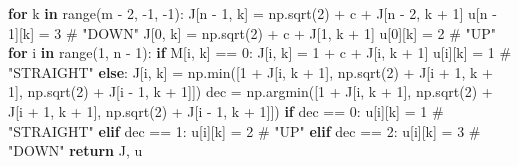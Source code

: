\documentclass[
]{article}
\newenvironment{Shaded}{\begin{snugshade}}{\end{snugshade}}
\newcommand{\BuiltInTok}[1]{\textcolor[rgb]{0.00,0.23,0.31}{#1}}
\newcommand{\CommentTok}[1]{\textcolor[rgb]{0.37,0.37,0.37}{#1}}
\newcommand{\ControlFlowTok}[1]{\textcolor[rgb]{0.00,0.23,0.31}{\textbf{#1}}}
\newcommand{\DecValTok}[1]{\textcolor[rgb]{0.68,0.00,0.00}{#1}}
\newcommand{\KeywordTok}[1]{\textcolor[rgb]{0.00,0.23,0.31}{\textbf{#1}}}
\newcommand{\NormalTok}[1]{\textcolor[rgb]{0.00,0.23,0.31}{#1}}
\newcommand{\OperatorTok}[1]{\textcolor[rgb]{0.37,0.37,0.37}{#1}}
\begin{document}
\begin{Shaded}
\begin{Highlighting}[]
    \ControlFlowTok{for}\NormalTok{ k }\KeywordTok{in} \BuiltInTok{range}\NormalTok{(m }\OperatorTok{{-}} \DecValTok{2}\NormalTok{, }\OperatorTok{{-}}\DecValTok{1}\NormalTok{, }\OperatorTok{{-}}\DecValTok{1}\NormalTok{):}
\NormalTok{        J[n }\OperatorTok{{-}} \DecValTok{1}\NormalTok{, k] }\OperatorTok{=}\NormalTok{ np.sqrt(}\DecValTok{2}\NormalTok{) }\OperatorTok{+}\NormalTok{ c }\OperatorTok{+}\NormalTok{ J[n }\OperatorTok{{-}} \DecValTok{2}\NormalTok{, k }\OperatorTok{+} \DecValTok{1}\NormalTok{]}
\NormalTok{        u[n }\OperatorTok{{-}} \DecValTok{1}\NormalTok{][k] }\OperatorTok{=} \DecValTok{3}      \CommentTok{\# "DOWN"}
\NormalTok{        J[}\DecValTok{0}\NormalTok{, k] }\OperatorTok{=}\NormalTok{ np.sqrt(}\DecValTok{2}\NormalTok{) }\OperatorTok{+}\NormalTok{ c }\OperatorTok{+}\NormalTok{ J[}\DecValTok{1}\NormalTok{, k }\OperatorTok{+} \DecValTok{1}\NormalTok{]}
\NormalTok{        u[}\DecValTok{0}\NormalTok{][k] }\OperatorTok{=} \DecValTok{2}          \CommentTok{\# "UP"}
        \ControlFlowTok{for}\NormalTok{ i }\KeywordTok{in} \BuiltInTok{range}\NormalTok{(}\DecValTok{1}\NormalTok{, n }\OperatorTok{{-}} \DecValTok{1}\NormalTok{):}
            \ControlFlowTok{if}\NormalTok{ M[i, k] }\OperatorTok{==} \DecValTok{0}\NormalTok{:}
\NormalTok{                J[i, k] }\OperatorTok{=} \DecValTok{1} \OperatorTok{+}\NormalTok{ c }\OperatorTok{+}\NormalTok{ J[i, k }\OperatorTok{+} \DecValTok{1}\NormalTok{]}
\NormalTok{                u[i][k] }\OperatorTok{=} \DecValTok{1}  \CommentTok{\# "STRAIGHT"}
            \ControlFlowTok{else}\NormalTok{:}
\NormalTok{                J[i, k] }\OperatorTok{=}\NormalTok{ np.}\BuiltInTok{min}\NormalTok{([}\DecValTok{1} \OperatorTok{+}\NormalTok{ J[i, k }\OperatorTok{+} \DecValTok{1}\NormalTok{], np.sqrt(}\DecValTok{2}\NormalTok{) }\OperatorTok{+}\NormalTok{ J[i }\OperatorTok{+} \DecValTok{1}\NormalTok{, k }\OperatorTok{+} \DecValTok{1}\NormalTok{], np.sqrt(}\DecValTok{2}\NormalTok{) }\OperatorTok{+}\NormalTok{ J[i }\OperatorTok{{-}} \DecValTok{1}\NormalTok{, k }\OperatorTok{+} \DecValTok{1}\NormalTok{]])}
\NormalTok{                dec }\OperatorTok{=}\NormalTok{ np.argmin([}\DecValTok{1} \OperatorTok{+}\NormalTok{ J[i, k }\OperatorTok{+} \DecValTok{1}\NormalTok{], np.sqrt(}\DecValTok{2}\NormalTok{) }\OperatorTok{+}\NormalTok{ J[i }\OperatorTok{+} \DecValTok{1}\NormalTok{, k }\OperatorTok{+} \DecValTok{1}\NormalTok{], np.sqrt(}\DecValTok{2}\NormalTok{) }\OperatorTok{+}\NormalTok{ J[i }\OperatorTok{{-}} \DecValTok{1}\NormalTok{, k }\OperatorTok{+} \DecValTok{1}\NormalTok{]])}
                \ControlFlowTok{if}\NormalTok{ dec }\OperatorTok{==} \DecValTok{0}\NormalTok{:}
\NormalTok{                    u[i][k] }\OperatorTok{=} \DecValTok{1}  \CommentTok{\# "STRAIGHT"}
                \ControlFlowTok{elif}\NormalTok{ dec }\OperatorTok{==} \DecValTok{1}\NormalTok{:}
\NormalTok{                    u[i][k] }\OperatorTok{=} \DecValTok{2}  \CommentTok{\# "UP"}
                \ControlFlowTok{elif}\NormalTok{ dec }\OperatorTok{==} \DecValTok{2}\NormalTok{:}
\NormalTok{                    u[i][k] }\OperatorTok{=} \DecValTok{3}  \CommentTok{\# "DOWN"}
    \ControlFlowTok{return}\NormalTok{ J, u}
\end{Highlighting}
\end{Shaded}
\end{document}
